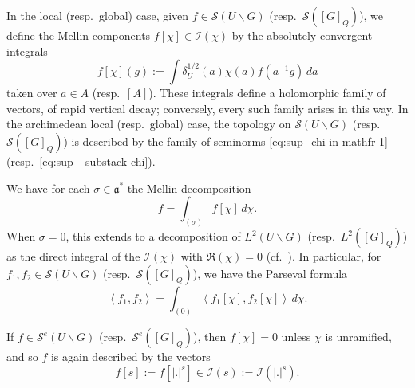 In the local (resp.\ global) case, given $f \in \mathcal{S}(U \backslash G)$ (resp.\ $\mathcal{S}([G]_Q)$), we define the Mellin components $f[\chi] \in \mathcal{I}(\chi)$ by the absolutely convergent integrals 
\begin{equation*}
  f[\chi](g) := \int \delta_U^{1/2}(a)  \chi(a) f(a^{-1} g) \, d a
\end{equation*}
taken over $a \in A$ (resp.\ $[A]$).  These integrals define a holomorphic family of vectors, of rapid vertical decay; conversely, every such family arises in this way.  In the archimedean local (resp.\ global) case, the topology on $\mathcal{S}(U \backslash G)$ (resp.\ $\mathcal{S}([G]_Q)$) is described by the family of seminorms \eqref{eq:sup_chi-in-mathfr-1} (resp.\ \eqref{eq:sup_-substack-chi}).

We have for each $\sigma \in \mathfrak{a}^*$ the Mellin decomposition
\begin{equation}\label{eq:f-=-int}
  f = \int_{(\sigma)} f[\chi] \, d \chi.
\end{equation}
When $\sigma = 0$, this extends to a decomposition of $L^2(U \backslash G)$ (resp.\ $L^2([G]_Q)$) as the direct integral of the $\mathcal{I}(\chi)$ with $\Re(\chi) = 0$ (cf.\ \cite[\S3.4.9, \S3.5.2]{MR3468638}).  In particular, for $f_1, f_2 \in \mathcal{S}(U \backslash G)$ (resp.\ $\mathcal{S}([G]_Q)$), we have the Parseval formula
\begin{equation}\label{eq:leftlangle-f_1-f_2}
  \left\langle f_1, f_2 \right\rangle
  =
  \int_{(0)}
  \left\langle f_1[\chi], f_2[\chi] \right\rangle \, d \chi.
\end{equation}

If $f \in \mathcal{S}^e(U \backslash G)$ (resp.\ $\mathcal{S}^e([G]_Q)$), then $f[\chi] = 0$ unless $\chi$ is unramified, and so $f$ is again described by the vectors
\begin{equation*}
  f[s] := f[|.|^s] \in
  \mathcal{I}(s) := \mathcal{I} (|.|^s).
\end{equation*}


